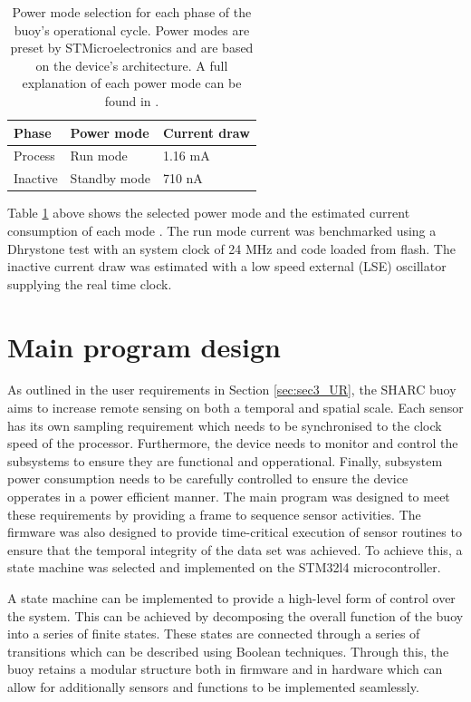 \begin{table}[H]
	\centering
	\caption{Power mode selection for each phase of the buoy's operational cycle. Power modes are preset by STMicroelectronics and are based on the device's architecture. A full explanation of each power mode can be found in \cite{stm32l4ref}.}
	\begin{tabular}{lll}
		\hline 
	\textbf{Phase} &  \textbf{Power mode} & \textbf{Current draw}\\
		\hline
		\hline
		Process & Run mode & 1.16 mA\\
		\hline
		Inactive & Standby mode & 710 nA\\
		\hline
		\hline
	\end{tabular}
	\label{tab:powmode_cycle}
\end{table}

Table \ref{tab:powmode_cycle} above shows the selected power mode and the estimated current consumption of each mode \cite{stm32l4}. The run mode current was benchmarked using a Dhrystone test with an system clock of 24 MHz and code loaded from flash. The inactive current draw was estimated with a low speed external (LSE) oscillator supplying the real time clock. 



\section{Main program design}
 
As outlined in the user requirements in Section \ref{sec:sec3_UR}, the SHARC buoy aims to increase remote sensing on both a temporal and spatial scale. Each sensor has its own sampling requirement which needs to be synchronised to the clock speed of the processor. Furthermore, the device needs to monitor and control the subsystems to ensure they are functional and opperational. Finally, subsystem power consumption needs to be carefully controlled to ensure the device opperates in a power efficient manner. The main program was designed to meet these requirements by providing a frame to sequence sensor activities. The firmware was also designed to provide time-critical execution of sensor routines to ensure that the temporal integrity of the data set was achieved. To achieve this, a state machine was selected and implemented on the STM32l4 microcontroller. \par

A state machine can be implemented to provide a high-level form of control over the system. This can be achieved by decomposing the overall function of the buoy into a series of finite states. These states are connected through a series of transitions which can be described using Boolean techniques. Through this, the buoy retains a modular structure both in firmware and in hardware which can allow for additionally sensors and functions to be implemented seamlessly.\par 

